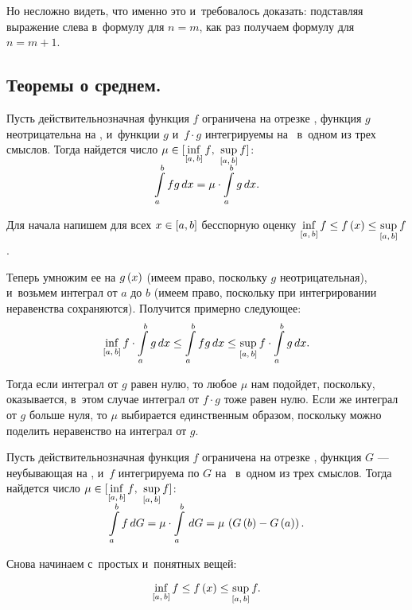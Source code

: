 \documentclass[draft]{article}
\begin{document}
Но несложно видеть, что именно это и~требовалось доказать:
подставляя выражение слева в~формулу для $n=m$, как раз получаем
формулу для $n=m+1$.

\prtm

\subsection{Теоремы о среднем.}


Пусть действительнозначная функция $f$ ограничена на отрезке \ab,
функция $g$ неотрицательна на \ab, и~функции $g$ и~$f\cdot g$
интегрируемы на \ab\ в~одном из трех смыслов. Тогда найдется число
$\mu\in\seg[{\smash{\inf\limits_{\seg[a,\,b]}f}\vphantom{\inf}},\
{\smash{\sup\limits_{\seg[a,\,b]}f}\vphantom{\sup}}]$:
$$\intab fg,x=\mu\cdot\intabgdx.$$

\pr

Для начала напишем для всех $x\in\segab$ бесспорную оценку
$\inf\limits_{\seg[a,\,b]}f\le f\atx\le\sup\limits_{\seg[a,\,b]}f$.

Теперь умножим ее на $g\atx$ (имеем право, поскольку $g$
неотрицательная), и~возьмем интеграл от $a$ до $b$ (имеем право,
поскольку при интегрировании неравенства сохраняются). Получится
примерно следующее:
$$\inf\limits_{\seg[a,\,b]}f\cdot\intabgdx\le\intab fg,
x\le\sup\limits_{\seg[a,\,b]}f\cdot\intabgdx.$$

\eject

Тогда если интеграл от $g$ равен нулю, то любое $\mu$ нам подойдет,
поскольку, оказывается, в~этом случае интеграл от $f\cdot g$ тоже
равен нулю. Если же интеграл от $g$ больше нуля, то $\mu$ выбирается
единственным образом, поскольку можно поделить неравенство на
интеграл от $g$.

\prtm

\bigskip


Пусть действительнозначная функция $f$ ограничена на отрезке \ab,
функция $G$ --- неубывающая на \ab, и~$f$ интегрируема по $G$ на
\ab\ в~одном из трех смыслов. Тогда найдется число
$\mu\in\seg[{\smash{\inf\limits_{\seg[a,\,b]}f}\vphantom{\inf}},\
{\smash{\sup\limits_{\seg[a,\,b]}f}\vphantom{\sup}}]$:
$$\intab f,G=\mu\cdot\intab ,G=\mu\,\at({G\at(b)-G\at(a)}).$$

\pr

Снова начинаем с~простых и~понятных вещей:

$$\inf\limits_{\seg[a,\,b]}f\le f\atx\le\sup\limits_{\seg[a,\,b]}f.$$
\end{document}
